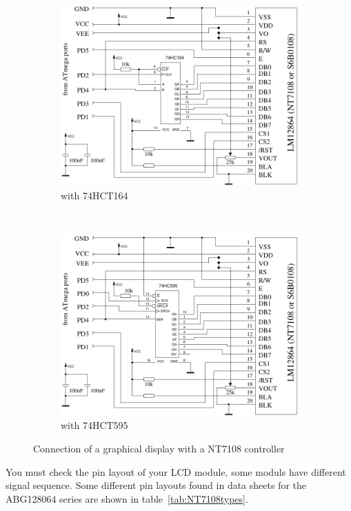 \begin{figure}[H]
  \begin{subfigure}[b]{.5\textwidth}
    \centering
    \includegraphics[width=.9\textwidth]{../FIG/ST7108serial164.pdf}
    \caption{with 74HCT164}
  \end{subfigure}
  ~
  \begin{subfigure}[b]{.5\textwidth}
    \centering
    \includegraphics[width=.9\textwidth]{../FIG/ST7108serial595.pdf}
    \caption{with 74HCT595}
  \end{subfigure}
  \caption{Connection of a graphical display with a NT7108 controller}
  \label{fig:NT7108lcd}
\end{figure}

You must check the pin layout of your LCD module, some moduls have different signal sequence.
Some different pin layouts found in data sheets for the ABG128064 series are shown in table~\ref{tab:NT7108types}.

